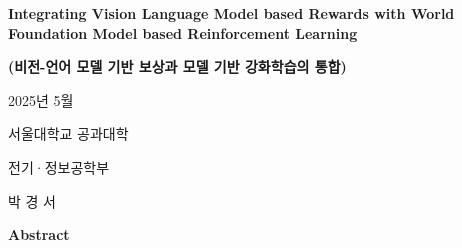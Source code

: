 \documentclass[11pt]{article}
\begin{document}
\begin{titlepage}
\begin{center}
\vspace*{1cm}
{\fontsize{21pt}{25pt}\selectfont\bfseries Integrating Vision Language Model based Rewards
with World Foundation Model based Reinforcement Learning\par}
\vspace{0.5cm}
{\fontsize{16pt}{19pt}\selectfont\bfseries (비전-언어 모델 기반 보상과 모델 기반 강화학습의 통합)\par}
\vspace{5cm}
{\fontsize{16pt}{19pt}\selectfont 2025년 5월 \par}
\vspace{3cm}
{\fontsize{16pt}{19pt}\selectfont 서울대학교 공과대학\par}
{\fontsize{16pt}{19pt}\selectfont 전기·정보공학부\par}
{\fontsize{16pt}{19pt}\selectfont 박 경 서\par}
\vspace{1.5cm}

\end{center}
\end{titlepage}



\begin{center}
\Large\textbf{Abstract}
\end{center}
\vspace{1cm}
\end{document}
